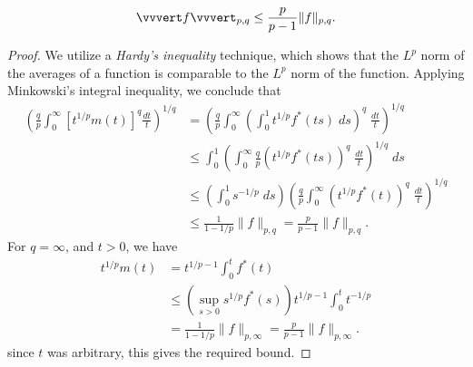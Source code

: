 \begin{theorem}
    \[ \vvvert f \vvvert_{p,q} \leq \frac{p}{p-1} \| f \|_{p,q}. \]
\end{theorem}
\begin{proof}
    We utilize a \emph{Hardy's inequality} technique, which shows that the $L^p$ norm of the averages of a function is comparable to the $L^p$ norm of the function. Applying Minkowski's integral inequality, we conclude that
    \begin{align*}
        \left( \frac{q}{p} \int_0^\infty [t^{1/p} m(t)]^q \frac{dt}{t} \right)^{1/q} &= \left( \frac{q}{p} \int_0^\infty \left( \int_0^1 t^{1/p} f^*(ts)\; ds \right)^q\; \frac{dt}{t} \right)^{1/q}\\
        &\leq \int_0^1 \left( \int_0^\infty \frac{q}{p} (t^{1/p} f^*(ts))^q\; \frac{dt}{t} \right)^{1/q}\; ds\\
        &\leq \left( \int_0^1 s^{- 1/p}\; ds \right) \left( \frac{q}{p} \int_0^\infty (t^{1/p} f^*(t))^q\; \frac{dt}{t} \right)^{1/q}\\
        &\leq \frac{1}{1 - 1/p} \| f \|_{p,q} = \frac{p}{p - 1} \| f \|_{p,q}.
    \end{align*}
    For $q = \infty$, and $t > 0$, we have
    \begin{align*}
        t^{1/p} m(t) &= t^{1/p - 1} \int_0^t f^*(t)\\
        &\leq (\sup_{s > 0} s^{1/p} f^*(s)) t^{1/p - 1} \int_0^t t^{-1/p}\\
        &= \frac{1}{1 - 1/p} \| f \|_{p,\infty} = \frac{p}{p-1} \| f \|_{p,\infty}.
    \end{align*}
    since $t$ was arbitrary, this gives the required bound.
\end{proof}


